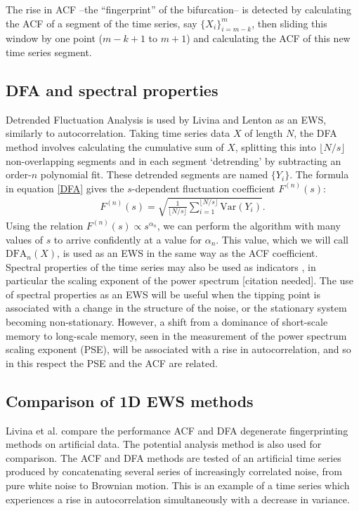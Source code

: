 \documentclass[11pt,a4paper,reqno]{article}
\numberwithin{equation}{section}
\begin{document}
The rise in ACF --the ``fingerprint'' of the bifurcation-- is  detected by calculating the ACF of a segment of the time series, say $\{X_i\}_{i=m-k}^{m}$, then sliding this window by one point ($m-k+1$ to $m+1$) and calculating the ACF of this new time series segment. 


\subsection{DFA and spectral properties}

Detrended Fluctuation Analysis \cite{kantelhardt2001} is used by Livina and Lenton \cite{livina2007} as an EWS, similarly to autocorrelation. Taking time series data $X$ of length $N$, the DFA method involves calculating the cumulative sum of $X$, splitting this into $\lfloor N/s \rfloor$ non-overlapping segments and in each segment `detrending' by subtracting an order-$n$ polynomial fit. These detrended segments are named $\{Y_i\}$. The formula in equation \ref{DFA} gives the $s$-dependent fluctuation coefficient $F^{(n)}(s)$:
\begin{align}
F^{(n)}(s) = \sqrt{ \frac{1}{\lfloor N/s \rfloor} \sum_{i=1}^{\lfloor N/s \rfloor} \text{Var}(Y_i)}.
\label{DFA}
\end{align}
Using the relation $F^{(n)}(s) \propto s^{\alpha_n}$, we can perform the algorithm with many values of $s$ to arrive confidently at a value for $\alpha_n$. This value, which we will call $\text{DFA}_n(X)$, is used as an EWS in the same way as the ACF coefficient.\\

Spectral properties of the time series may also be used as indicators \cite{kleinen2003}, in particular the scaling exponent of the power spectrum [citation needed].  The use of spectral properties as an EWS will be useful when the tipping point is associated with a change in the structure of the noise, or the stationary system becoming non-stationary. However, a shift from a dominance of short-scale memory to long-scale memory, seen in the measurement of the power spectrum scaling exponent (PSE), will be associated with a rise in autocorrelation, and so in this respect the PSE and the ACF are related. 

\subsection{Comparison of 1D EWS methods}
Livina et al. \cite{livina2012} compare the performance ACF and DFA degenerate fingerprinting methods on artificial  data. The potential analysis method \cite{livina2011} is also used for comparison. The ACF and DFA methods are tested of an artificial time series produced by concatenating several series of increasingly correlated noise, from pure white noise to Brownian motion. This is an example of a time series which experiences a rise in autocorrelation simultaneously with a decrease in variance. 
\end{document}
